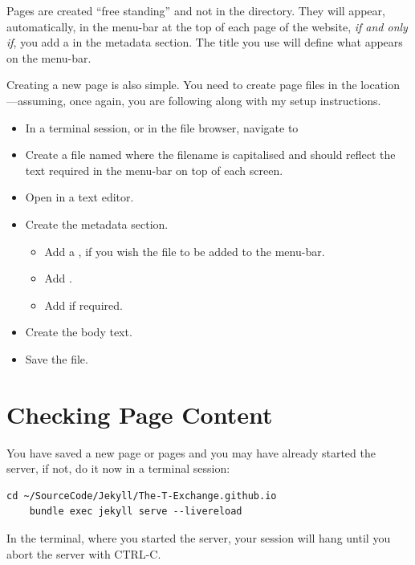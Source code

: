 Pages are created ``free standing'' and not in the  directory. They will appear, automatically, in the menu-bar at the top of each page of the website, \emph{if and only if}, you add a  in the metadata section. The title you use will define what appears on the menu-bar.

Creating a new page is also simple. You need to create page files in the location ---assuming, once again, you are following along with my setup instructions.

\begin{itemize}
    \item In a terminal session, or in the file browser, navigate to 
    \item Create a file named  where the filename is capitalised and should reflect the text required in the menu-bar on top of each screen.
    \item Open  in a text editor.
    \item Create the metadata section.
    \begin{itemize}
        \item Add a , if you wish the file to be added to the menu-bar.
        \item Add .
        \item Add  if required.
    \end{itemize}
    \item Create the body text.
    \item Save the file.
\end{itemize}


\section{Checking Page Content}

You have saved a new page or pages and you may have already started the server, if not, do it now in a terminal session:

\begin{lstlisting}[style=myText]
    cd ~/SourceCode/Jekyll/The-T-Exchange.github.io
    bundle exec jekyll serve --livereload
\end{lstlisting}

In the terminal, where you started the server, your session will hang until you abort the server with CTRL-C.

